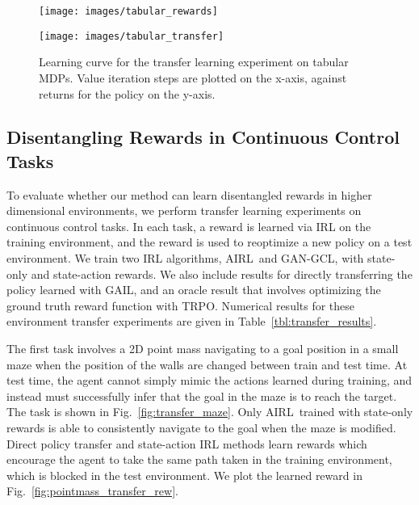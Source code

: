 \documentclass{article} \usepackage{iclr2018_conference,times}
\newcommand{\algnameabbrev}{AIRL}
\begin{document}
\begin{figure*}[t]
\setlength{\unitlength}{0.99\columnwidth}
    \centering
    \begin{minipage}{.59\textwidth}
\texttt{[image: images/tabular\_rewards]}
         \vspace{-0.1in}

\caption{
\label{fig:tabular_rewards}
Ground truth (a) and learned rewards (b, c) on the random MDP task. Dark blue corresponds to a reward of 1, and white corresponds to 0. Note that AIRL with a state-only reward recovers the ground truth, whereas the state-action reward is shaped. 
}
    \end{minipage}\hfill
    \begin{minipage}{0.39\textwidth}
        \centering
    \texttt{[image: images/tabular\_transfer]}
     \vspace{-0.2in}
\caption{
\label{fig:tabular_transfer}
Learning curve for the transfer learning experiment on tabular MDPs. Value iteration steps are plotted on the x-axis, against returns for the policy on the y-axis.
}
\end{minipage}
    

\end{figure*}

\subsection{Disentangling Rewards in Continuous Control Tasks}

To evaluate whether our method can learn disentangled rewards in higher dimensional environments, we perform transfer learning experiments on continuous control tasks. In each task, a reward is learned via IRL on the training environment, and the reward is used to reoptimize a new policy on a test environment. We train two IRL algorithms, \algnameabbrev\ and GAN-GCL, with state-only and state-action rewards. We also include results for directly transferring the policy learned with GAIL, and an oracle result that involves optimizing the ground truth reward function with TRPO. Numerical results for these environment transfer experiments are given in Table~\ref{tbl:transfer_results}.

The first task involves a 2D point mass navigating to a goal position in a small maze when the position of the walls are changed between train and test time. At test time, the agent cannot simply mimic the actions learned during training, and instead must successfully infer that the goal in the maze is to reach the target. The task is shown in Fig.~\ref{fig:transfer_maze}. Only \algnameabbrev\ trained with state-only rewards is able to consistently navigate to the goal when the maze is modified. Direct policy transfer and state-action IRL methods learn rewards which encourage the agent to take the same path taken in the training environment, which is blocked in the test environment. We plot the learned reward in Fig.~\ref{fig:pointmass_transfer_rew}. 
\end{document}
